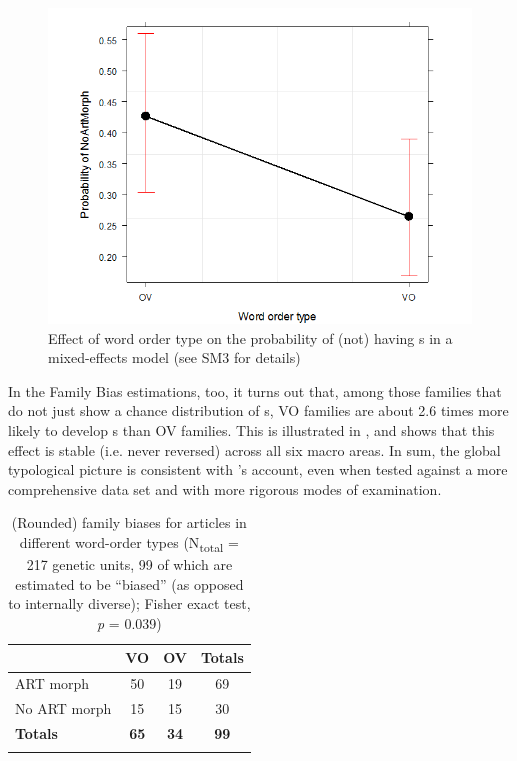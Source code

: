 \documentclass[output=paper]{langsci/langscibook}
\begin{document}
  

\begin{figure}
\includegraphics[height=.3\textheight]{figures/schmidtkebode-img2.png}
\caption{Effect of word order type on the probability of (not) having s in a mixed-effects model (see SM3 for details)}
\label{fig:ksb:2}
\end{figure}

In the Family Bias estimations, too, it turns out that, among those families that do not just show a chance distribution of s, VO families are about 2.6 times more likely to develop s than OV families. This is illustrated in , and  shows that this effect is stable (i.e. never reversed) across all six macro areas. In sum, the global typological picture is consistent with ’s  account, even when tested against a more comprehensive data set and with more rigorous modes of examination.
 

\begin{table}
\begin{tabularx}{.8\textwidth}{lSSS}
\lsptoprule
& VO &   OV &   Totals\\
\midrule 
ART morph & 50 & 19 & 69\\
No ART morph & 15 & 15 & 30\\
\midrule
\textbf{Totals} & \textbf{65} & \textbf{34} & \textbf{99}\\
\lspbottomrule
\end{tabularx} 
\caption{(Rounded) family biases for articles in different word-order types (N\textsubscript{total} = 217 genetic units, 99 of which are estimated to be “biased” (as opposed to internally diverse); Fisher exact test, \textit{p} = 0.039)}
\label{tab:ksb:3}
\end{table}
   
\end{document}
